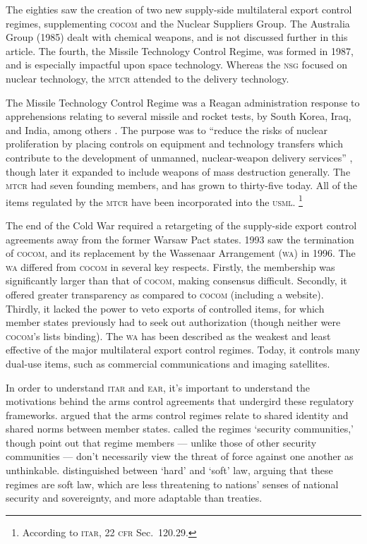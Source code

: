 \documentclass[preprint,twocolumn,5p]{elsarticle}
\begin{document}
The eighties saw the creation of two new supply-side multilateral export control regimes, supplementing \textsc{cocom} and the Nuclear Suppliers Group. The Australia Group (1985) dealt with chemical weapons, and is not discussed further in this article. The fourth, the Missile Technology Control Regime, was formed in 1987, and is especially impactful upon space technology. Whereas the \textsc{nsg} focused on nuclear technology, the \textsc{mtcr} attended to the delivery technology.

The Missile Technology Control Regime was a Reagan administration response to apprehensions relating to several missile and rocket tests, by South Korea, Iraq, and India, among others \citep{Scheffran1992}. The purpose was to ``reduce the risks of nuclear proliferation by placing controls on equipment and technology transfers which contribute to the development of unmanned, nuclear-weapon delivery services'' \citep{Fialka1987}, though later it expanded to include weapons of mass destruction generally. The \textsc{mtcr} had seven founding members, and has grown to thirty-five today. All of the items regulated by the \textsc{mtcr} have been incorporated into the \textsc{usml}. \footnote{According to \textsc{itar}, 22 \textsc{cfr} Sec.~120.29.}

The end of the Cold War required a retargeting of the supply-side export control agreements away from the former Warsaw Pact states. 1993 saw the termination of \textsc{cocom}, and its replacement by the Wassenaar Arrangement (\textsc{wa}) in 1996. The \textsc{wa} differed from \textsc{cocom} in several key respects. Firstly, the membership was significantly larger than that of \textsc{cocom}, making consensus difficult. Secondly, it offered greater transparency as compared to \textsc{cocom} (including a website). Thirdly, it lacked the power to veto exports of controlled items, for which member states previously had to seek out authorization (though neither were \textsc{cocom}'s lists binding). The \textsc{wa} has been described as the weakest and least effective of the major multilateral export control regimes. Today, it controls many dual-use items, such as commercial communications and imaging satellites.

In order to understand \textsc{itar} and \textsc{ear}, it's important to understand the motivations behind the arms control agreements that undergird these regulatory frameworks. \citet{Lipson1999} argued that the arms control regimes relate to shared identity and shared norms between member states. \citet{Joyner2004} called the regimes `security communities,' though \citet{Beck2019} point out that regime members --- unlike those of other security communities --- don't necessarily view the threat of force against one another as unthinkable. \citet{Abbott2000} distinguished between `hard' and `soft' law, arguing that these regimes are soft law, which are less threatening to nations' senses of national security and sovereignty, and more adaptable than treaties.
\end{document}
